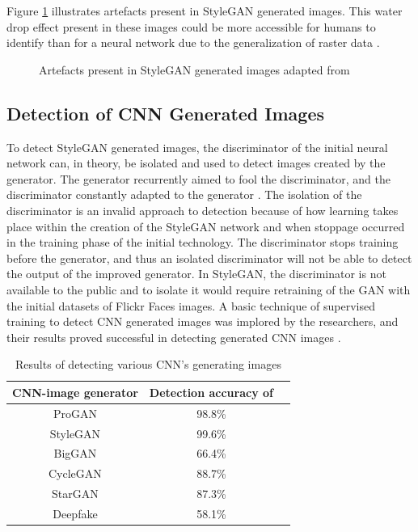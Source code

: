 Figure \ref{fig:8} illustrates artefacts present in StyleGAN generated images. This water drop effect present in these images could be more accessible for humans to identify than for a neural network due to the generalization of raster data \citep{Karras2020}.

\begin{figure}[H]%
\centering
{}%
\caption{Artefacts present in StyleGAN generated images adapted from \cite{Karras2020}}%
\label{fig:8}%
\end{figure}

\subsection{Detection of CNN Generated Images}

To detect StyleGAN generated images, the discriminator of the initial neural network can, in theory, be isolated and used to detect images created by the generator. The generator recurrently aimed to fool the discriminator, and the discriminator constantly adapted to the generator \citep{Karras2020}. The isolation of the discriminator is an invalid approach to detection because of how learning takes place within the creation of the StyleGAN network and when stoppage occurred in the training phase of the initial technology. The discriminator stops training before the generator, and thus an isolated discriminator will not be able to detect the output of the improved generator. In StyleGAN, the discriminator is not available to the public and to isolate it would require retraining of the GAN with the initial datasets of Flickr Faces images. A basic technique of supervised training to detect CNN generated images was implored by the researchers, and their results proved successful in detecting generated CNN images \citep{Wang}.

\begin{table}[H]%
\caption{Results of \cite{Wang} detecting various CNN's generating images}
\label{tabl:1}
\centering
\small
\begin{tabular}{ccc}
\hline
CNN-image generator & Detection accuracy of \citep{Wang}\\ 
\hline
ProGAN & 98.8\% \\
StyleGAN & 99.6\% \\
BigGAN & 66.4\%\\
CycleGAN & 88.7\%\\
StarGAN & 87.3\%\\
Deepfake & 58.1\%\\
\hline
\end{tabular}
\end{table}

